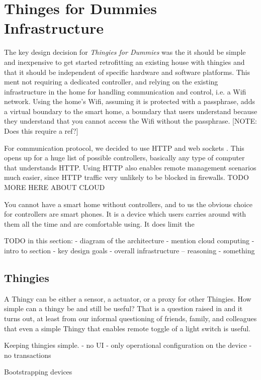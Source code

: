 \documentclass{article}
\begin{document}
\section{Thinges for Dummies Infrastructure}

The key design decision for \textit{Thingies for Dummies} was the it should be simple and  inexpensive to get started retrofitting an existing house with thingies and that it should be independent of specific hardware and software platforms. This ment not requiring a dedicated controller, and relying on the existing infrastructure in the home for handling communication and control, i.e. a Wifi network. Using the home’s Wifi, assuming it is protected with a passphrase, adds a virtual boundary to the smart home, a boundary that users understand because they understand that you cannot access the Wifi without the passphrase. [NOTE: Does this require a ref?]

For communication protocol, we decided to use HTTP and web sockets . This opens up for a huge list of possible controllers, basically any type of computer that understands HTTP. Using HTTP also enables remote management scenarios much easier, since HTTP traffic very unlikely to be blocked in firewalls. TODO MORE HERE ABOUT CLOUD

You cannot have a smart home without controllers, and to us the obvious choice for controllers are smart phones. It is a device which users carries around with them all the time and are comfortable using. It does limit the

TODO in this section:
- diagram of the architecture
- mention cloud computing
- intro to section
- key design goals
- overall infrastructure -- reasoning
- something

\subsection{Thingies}

A Thingy can be either a sensor, a actuator, or a proxy for other Thingies.
How simple can a thingy be and still be useful? That is a question raised in \cite{Edwards01athome} and it turns out, at least from our informal questioning of friends, family, and colleagues that even a simple Thingy that enables remote toggle of a light switch is useful.



Keeping thingies simple.
- no UI
- only operational configuration on the device
- no transactions

Bootstrapping devices
\end{document}
